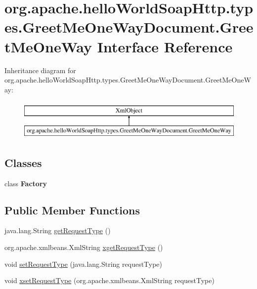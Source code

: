 \hypertarget{interfaceorg_1_1apache_1_1hello_world_soap_http_1_1types_1_1_greet_me_one_way_document_1_1_greet_me_one_way}{}\section{org.\+apache.\+hello\+World\+Soap\+Http.\+types.\+Greet\+Me\+One\+Way\+Document.\+Greet\+Me\+One\+Way Interface Reference}
\label{interfaceorg_1_1apache_1_1hello_world_soap_http_1_1types_1_1_greet_me_one_way_document_1_1_greet_me_one_way}
Inheritance diagram for org.\+apache.\+hello\+World\+Soap\+Http.\+types.\+Greet\+Me\+One\+Way\+Document.\+Greet\+Me\+One\+Way\+:\begin{figure}[H]
\begin{center}
\leavevmode
\includegraphics[height=2.000000cm]{interfaceorg_1_1apache_1_1hello_world_soap_http_1_1types_1_1_greet_me_one_way_document_1_1_greet_me_one_way}
\end{center}
\end{figure}
\subsection*{Classes}
\begin{DoxyCompactItemize}
\item 
class {\bfseries Factory}
\end{DoxyCompactItemize}
\subsection*{Public Member Functions}
\begin{DoxyCompactItemize}
\item 
java.\+lang.\+String \hyperlink{interfaceorg_1_1apache_1_1hello_world_soap_http_1_1types_1_1_greet_me_one_way_document_1_1_greet_me_one_way_ab2a766395af67b0d212d9a81a3eb8fb9}{get\+Request\+Type} ()
\item 
org.\+apache.\+xmlbeans.\+Xml\+String \hyperlink{interfaceorg_1_1apache_1_1hello_world_soap_http_1_1types_1_1_greet_me_one_way_document_1_1_greet_me_one_way_af1bc92b265eb9d5a5523a554a4cca865}{xget\+Request\+Type} ()
\item 
void \hyperlink{interfaceorg_1_1apache_1_1hello_world_soap_http_1_1types_1_1_greet_me_one_way_document_1_1_greet_me_one_way_a8943c5fa7be2b09f02ba69d765a8ad45}{set\+Request\+Type} (java.\+lang.\+String request\+Type)
\item 
void \hyperlink{interfaceorg_1_1apache_1_1hello_world_soap_http_1_1types_1_1_greet_me_one_way_document_1_1_greet_me_one_way_a1457fd714d1a937cad397fd5a3b73a72}{xset\+Request\+Type} (org.\+apache.\+xmlbeans.\+Xml\+String request\+Type)
\end{DoxyCompactItemize}
